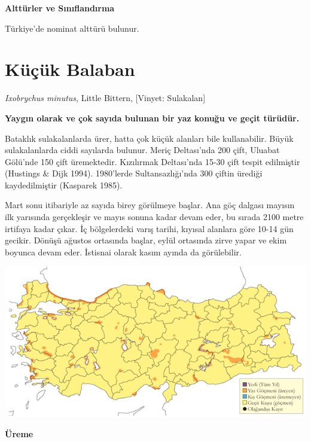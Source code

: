 \documentclass[
  letterpaper,
  DIV=11,
  numbers=noendperiod]{scrreprt}
\begin{document}
\textbf{Alttürler ve Sınıflandırma}

Türkiye'de nominat alttürü bulunur.

\section{Küçük Balaban}\label{kuxfcuxe7uxfck-balaban}

\emph{Ixobrychus minutus}, Little Bittern, {[}Vinyet: Sulakalan{]}

\textbf{Yaygın olarak ve çok sayıda bulunan bir yaz konuğu ve geçit
türüdür.}

Bataklık sulakalanlarda ürer, hatta çok küçük alanları bile
kullanabilir. Büyük sulakalanlarda ciddi sayılarda bulunur. Meriç
Deltası'nda 200 çift, Uluabat Gölü'nde 150 çift üremektedir. Kızılırmak
Deltası'nda 15-30 çift tespit edilmiştir (Hustings \& Dijk 1994).
1980'lerde Sultansazlığı'nda 300 çiftin ürediği kaydedilmiştir (Kasparek
1985).

Mart sonu itibariyle az sayıda birey görülmeye başlar. Ana göç dalgası
mayısın ilk yarısında gerçekleşir ve mayıs sonuna kadar devam eder, bu
sırada 2100 metre irtifaya kadar çıkar. İç bölgelerdeki varış tarihi,
kıyısal alanlara göre 10-14 gün gecikir. Dönüşü ağustos ortasında
başlar, eylül ortasında zirve yapar ve ekim boyunca devam eder. İstisnai
olarak kasım ayında da görülebilir.

\includegraphics{images/harita_Page_065.png}

\textbf{Üreme}
\end{document}

